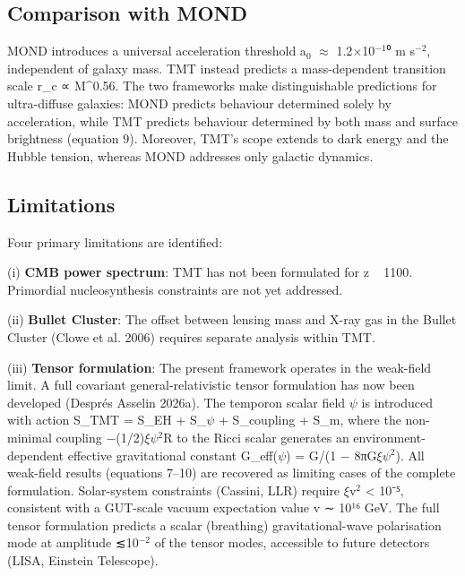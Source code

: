 \documentclass[a4paper,fleqn,usenatbib]{mnras}
\begin{document}
\subsection{Comparison with MOND}\label{sec:5-2-comparison-with-mond}

MOND introduces a universal acceleration threshold a$_0$ $\approx$ 1.2$\times$10$^{-1}$⁰ m s$^{-2}$, independent of galaxy mass. TMT instead predicts a mass-dependent transition scale r_c ∝ M^0.56. The two frameworks make distinguishable predictions for ultra-diffuse galaxies: MOND predicts behaviour determined solely by acceleration, while TMT predicts behaviour determined by both mass and surface brightness (equation 9). Moreover, TMT's scope extends to dark energy and the Hubble tension, whereas MOND addresses only galactic dynamics.


\subsection{Limitations}\label{sec:5-3-limitations}

Four primary limitations are identified:

(i) \textbf{CMB power spectrum}: TMT has not been formulated for z ~ 1100. Primordial nucleosynthesis constraints are not yet addressed.

(ii) \textbf{Bullet Cluster}: The offset between lensing mass and X-ray gas in the Bullet Cluster (Clowe et al. 2006) requires separate analysis within TMT.

(iii) \textbf{Tensor formulation}: The present framework operates in the weak-field limit. A full covariant general-relativistic tensor formulation has now been developed (Després Asselin 2026a). The temporon scalar field $\psi$ is introduced with action S_TMT = S_EH + S_$\psi$ + S_coupling + S_m, where the non-minimal coupling −(1/2)$\xi$$\psi$$^{2}$R to the Ricci scalar generates an environment-dependent effective gravitational constant G_eff($\psi$) = G/(1 − 8πG$\xi$$\psi$$^{2}$). All weak-field results (equations 7–10) are recovered as limiting cases of the complete formulation. Solar-system constraints (Cassini, LLR) require $\xi$v$^{2}$ < 10⁻⁵, consistent with a GUT-scale vacuum expectation value v ∼ 10¹⁶ GeV. The full tensor formulation predicts a scalar (breathing) gravitational-wave polarisation mode at amplitude ≲10$^{-2}$ of the tensor modes, accessible to future detectors (LISA, Einstein Telescope).
\end{document}
